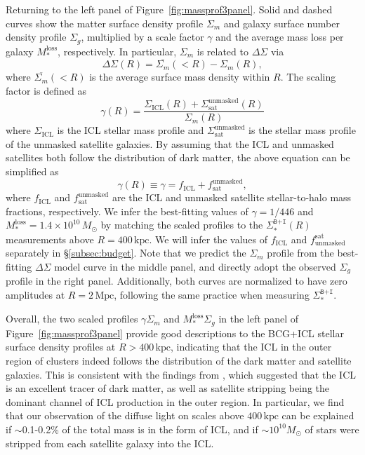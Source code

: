 \documentclass[fleqn,usenatbib]{mnras}
\newcommand{\sigbi}{\Sigma_*^{\texttt{B+I}}}
\newcommand{\sigm}{\Sigma_m}
\newcommand{\sigg}{\Sigma_g}
\newcommand{\mpc}{\mathrm{Mpc}}
\newcommand{\kpc}{\mathrm{kpc}}
\newcommand{\msol}{M_{\odot}}
\newcommand{\ds}{\Delta\Sigma}
\begin{document}
Returning to the left panel of Figure~\ref{fig:massprof3panel}.  Solid and
dashed curves show the matter surface density profile $\sigm$ and galaxy
surface number density profile $\sigg$, multiplied by a scale factor
$\gamma$ and the average mass loss per galaxy $M_*^{\mathrm{loss}}$,
respectively. In particular, $\sigm$ is related to $\ds$ via
\begin{equation}
    \ds(R) = \overline{\sigm}({<}R) - \sigm(R),
\end{equation}
where $\overline{\sigm}({<}R)$ is the average surface mass density within
$R$. The scaling factor is defined as
\begin{equation}
    \gamma(R) = \frac{\Sigma_{\mathrm{ICL}}(R) +
    \Sigma^{\mathrm{unmasked}}_{\mathrm{sat}}(R)}{\sigm(R)}
    \label{eqn:gamma}
\end{equation}
where $\Sigma_{\mathrm{ICL}}$ is the ICL stellar mass profile and
$\Sigma^{\mathrm{unmasked}}_{\mathrm{sat}}$ is the stellar mass profile of
the unmasked satellite galaxies. By assuming that the ICL and unmasked
satellites both follow the distribution of dark matter, the above equation can be simplified as
\begin{equation}
    \gamma(R)\equiv \gamma =f_{\mathrm{ICL}} + f^{\mathrm{unmasked}}_{\mathrm{sat}},
    \label{eqn:gamma2}
\end{equation}
where $f_{\mathrm{ICL}}$ and $f^{\mathrm{unmasked}}_{\mathrm{sat}}$ are the
ICL and unmasked satellite stellar-to-halo mass fractions, respectively.  We
infer the best-fitting values of $\gamma{=}1/446$ and
$M_*^{\mathrm{loss}}{=}1.4{\times}10^{10}\,\msol$ by matching the scaled
profiles to the $\sigbi(R)$ measurements above $R{=}400\,\kpc$. We will
infer the values of $f_{\mathrm{ICL}}$ and
$f_{\mathrm{unmasked}}^{\mathrm{sat}}$ separately in \S\ref{subsec:budget}.
Note that we predict the $\sigm$ profile from the best-fitting $\ds$ model
curve in the middle panel, and directly adopt the observed $\sigg$ profile
in the right panel.  Additionally, both curves are normalized to have zero
amplitudes at $R{=}2\,\mpc$, following the same practice when measuring
$\sigbi$.


Overall, the two scaled profiles $\gamma\sigm$ and
$M_*^{\mathrm{loss}}\sigg$ in the left panel of
Figure~\ref{fig:massprof3panel} provide good descriptions to the BCG+ICL
stellar surface density profiles at $R{>}400\,\kpc$, indicating that the
ICL in the outer region of clusters indeed follows the distribution of the
dark matter and satellite galaxies. This is consistent with the findings
from \citet{Montes2019}, which suggested that the ICL is an excellent
tracer of dark matter, as well as satellite stripping being the dominant
channel of ICL production in the outer region. In particular, we find that
our observation of the diffuse light on scales above $400\,\kpc$ can be
explained if $\sim$0.1{-}0.2\% of the total mass is in the form of ICL, and
if ${\sim}10^{10}\msol$ of stars were stripped from each satellite galaxy
into the ICL.
\end{document}
